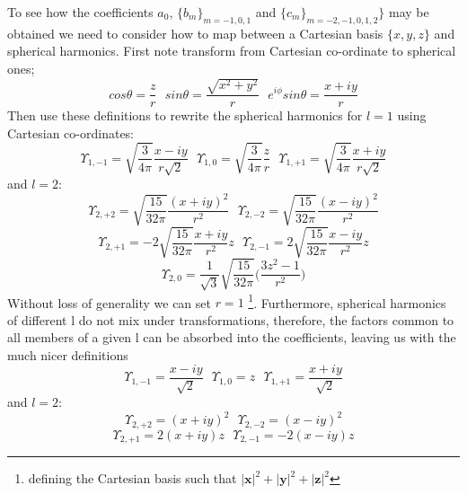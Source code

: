 \documentclass[12pt]{article}
\begin{document}
\noindent To see how the coefficients $a_{0}$, $\{b_{m}\}_{m=-1,0,1}$ and 
 $\{c_{m}\}_{m=-2,-1,0,1,2}\}$ may be
obtained we need to consider how to map between a Cartesian basis $\{x,y,z\}$
and spherical harmonics. First note transform from Cartesian co-ordinate to 
spherical ones; 
\begin{equation}
cos \theta = \frac{z}{r} \text{\ \ \ }
sin \theta = \frac{\sqrt{x^{2}+y^{2}}}{r} \text{\ \ \ }
e^{i\phi} sin\theta  = \frac{x+iy}{r} 
\end{equation}
\noindent Then use these definitions to rewrite the spherical harmonics for
$l=1$ using Cartesian co-ordinates:
\begin{equation}
\Upsilon_{1,-1} = \sqrt{\frac{3}{4\pi}}\frac{x-iy}{r\sqrt{2}} \text{\ \ \ }
\Upsilon_{1,0} = \sqrt{\frac{3}{4\pi}}\frac{z}{r} \text{\ \ \ }
\Upsilon_{1,+1} = \sqrt{\frac{3}{4\pi}}\frac{x+iy}{r\sqrt{2}}
\end{equation}
and $l=2$:
\begin{equation*}
\Upsilon_{2,+2} = \sqrt{\frac{15}{32\pi}}\frac{(x+iy)^{2}}{r^{2}} \text{\ \ \ }
\Upsilon_{2,-2} = \sqrt{\frac{15}{32\pi}}\frac{(x-iy)^{2}}{r^{2}}
\end{equation*}
\begin{equation*}
\Upsilon_{2,+1} = -2\sqrt{\frac{15}{32\pi}}\frac{x+iy}{r^{2}}z \text{\ \ \ }
\Upsilon_{2,-1} = 2\sqrt{\frac{15}{32\pi}}\frac{x-iy}{r^{2}}z
 \end{equation*}
\begin{equation}
\Upsilon_{2,0} = \frac{1}{\sqrt{3}}
 \sqrt{\frac{15}{32\pi}}\Bigg( \frac{3z^{2}-1}{r^{2}} \Bigg )
\end{equation}
\noindent Without loss of generality we can set $r=1$ 
\footnote{defining the Cartesian basis such that $|\mathbf{x}|^{2}+|\mathbf{y}|^{2}+|\mathbf{z}|^{2}$ }. Furthermore, spherical harmonics of different 
l do not mix under transformations, therefore, the factors common to
all members of a given l can be absorbed into the coefficients, leaving 
us with the much nicer definitions
\begin{equation}
\Upsilon_{1,-1} = \frac{x-iy}{\sqrt{2}} \text{\ \ \ }
\Upsilon_{1,0}  = z \text{\ \ \ }
\Upsilon_{1,+1} = \frac{x+iy}{\sqrt{2}}
\end{equation}
and $l=2$:
\begin{equation*}
\Upsilon_{2,+2} = (x+iy)^{2}\text{\ \ \ }
\Upsilon_{2,-2} = (x-iy)^{2}
\end{equation*}
\begin{equation*}
\Upsilon_{2,+1} = 2(x+iy)z \text { \ \ \ }
\Upsilon_{2,-1} = -2(x-iy)z 
\end{equation*}
\end{document}
